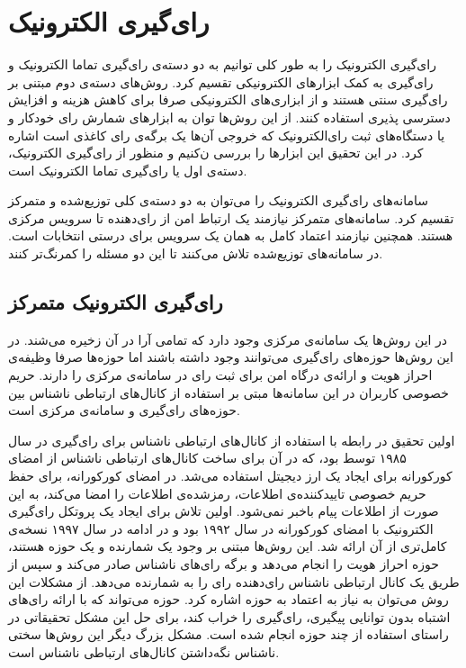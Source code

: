 \section{رای‌گیری الکترونیک}
رای‌گیری الکترونیک را به طور کلی ‌‌توانیم به دو دسته‌ی رای‌گیری تماما الکترونیک و رای‌گیری به کمک ابزار‌های الکترونیکی تقسیم کرد. روش‌های دسته‌ی دوم مبتنی بر رای‌گیری سنتی هستند و از ابزاری‌های الکترونیکی صرفا برای کاهش هزینه و افزایش دسترسی پذیری استفاده ‌‌کنند. از این روش‌ها ‌‌توان به ابزارهای شمارش رای خودکار و یا دستگاه‌های ثبت رای‌الکترونیک که خروجی آن‌ها یک برگه‌ی رای‌ کاغذی
است اشاره کرد. در این تحقیق این ابزارها را بررسی ن‌‌کنیم و منظور از رای‌گیری الکترونیک، دسته‌ی اول یا رای‌گیری تماما الکترونیک است.
\par
سامانه‌های رای‌گیری الکترونیک را می‌توان به دو د‌سته‌ی کلی توزیع‌شده و متمرکز تقسیم کرد. سامانه‌های متمرکز نیازمند یک ارتباط امن از رای‌دهنده تا سرویس مرکزی هستند. همچنین نیازمند اعتماد کامل به همان یک سرویس برای درستی انتخابات است. در سامانه‌های توزیع‌شده تلاش می‌کنند تا این دو مسئله را کمرنگ‌تر کنند.

\subsection{رای‌گیری الکترونیک متمرکز}
در این روش‌ها یک سامانه‌ی مرکزی وجود دارد که تمامی آرا در آن زخیره می‌شند. در این روش‌ها حوزه‌های رای‌گیری می‌توانند وجود داشته باشند اما حوزه‌ها صرفا وظیفه‌ی احراز هویت و ارائه‌ی درگاه امن برای ثبت رای در سامانه‌ی مرکزی را دارند. حریم خصوصی کاربران در این سامانه‌ها مبتی بر استفاده از کانال‌های ارتباطی ناشناس 
بین حوزه‌های رای‌گیری و سامانه‌ی مرکزی است.
\par
اولین تحقیق در رابطه با استفاده‌ از کانال‌های ارتباطی ناشناس برای رای‌گیری در سال ۱۹۸۵ توسط 
\cite{Chaum}
بود، که در آن برای ساخت‌ کانال‌های ارتباطی ناشناس از امضای کورکورانه 
\cite{blindsig}
برای ایجاد یک ارز دیجیتل استفاده می‌شد. در امضای کورکورانه، برای حفظ حریم خصوصی تاییدکننده‌ی اطلاعات، رمزشده‌ی اطلاعات را امضا می‌کند، به این صورت از اطلاعات پیام باخبر نمی‌شود. اولین تلاش برای ایجاد یک پروتکل رای‌گیری الکترونیک با امضای کورکورانه در سال ۱۹۹۲ 
\cite{foo92}
بود و در ادامه در سال ۱۹۹۷
\cite{improveblind}
نسخه‌ی کامل‌تری از آن ارائه شد. این روش‌ها مبتنی بر وجود یک شمارنده و یک حوزه هستند، حوزه احراز هویت را انجام می‌دهد و برگه‌ رای‌های ناشناس صادر می‌کند و سپس از طریق یک کانال ارتباطی ناشناس رای‌دهنده رای را به شمارنده می‌دهد. از مشکلات این روش می‌توان به نیاز به اعتماد به حوزه اشاره کرد. حوزه می‌تواند که با ارائه رای‌های اشتباه بدون توانایی پیگیری، رای‌گیری را خراب کند، برای حل این مشکل تحقیقاتی
\cite{multiteller}
در راستای استفاده از چند حوزه انجام شده است. مشکل بزرگ دیگر این روش‌ها
\cite{anonchan}
سختی ناشناس نگه‌داشتن کانال‌های ارتباطی ناشناس است.

